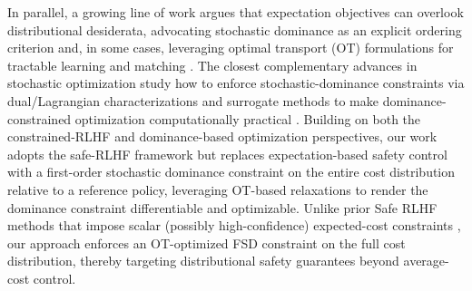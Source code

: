 In parallel, a growing line of work argues that expectation objectives can overlook distributional desiderata, advocating stochastic dominance as an explicit ordering criterion and, in some cases, leveraging optimal transport (OT) formulations for tractable learning and matching \citep{melnyk2024distributional,farajzadeh2025imitation,cen2024beyond}. The closest complementary advances in stochastic optimization study how to enforce stochastic-dominance constraints via dual/Lagrangian characterizations and surrogate methods to make dominance-constrained optimization computationally practical \citep{dentcheva2003optimization,dai2023learning,cen2024beyond}. Building on both the constrained-RLHF and dominance-based optimization perspectives, our work adopts the safe-RLHF framework but replaces expectation-based safety control with a first-order stochastic dominance constraint on the entire cost distribution relative to a reference policy, leveraging OT-based relaxations to render the dominance constraint differentiable and optimizable. Unlike prior Safe RLHF methods that impose scalar (possibly high-confidence) expected-cost constraints \citep{dai2023safe,chittepu2025reinforcement}, our approach enforces an OT-optimized FSD constraint on the full cost distribution, thereby targeting distributional safety guarantees beyond average-cost control.
